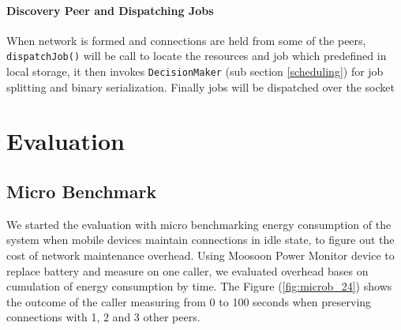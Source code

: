 \documentclass[conference]{IEEEtran}
\begin{document}
\noindent {}	

\paragraph{Discovery Peer and Dispatching Jobs}

When network is formed and connections are held from some of the peers, \texttt{dispatchJob()} will be call to locate the resources and job which predefined in local storage, it then invokes \texttt{DecisionMaker} (sub section \ref{scheduling}) for job splitting and binary serialization. Finally jobs will be dispatched over the socket\\

\noindent {}

\section{Evaluation}
\label{sec:eval}

\subsection{Micro Benchmark}
We started the evaluation with micro benchmarking energy consumption of the system when mobile devices maintain connections in idle state, to figure out the cost of network maintenance overhead. Using Moosoon Power Monitor device \cite{moosoon} to replace battery and measure on one caller, we evaluated overhead bases on cumulation of energy consumption by time. The Figure (\ref{fig:microb_24}) shows the outcome of the caller measuring from 0 to 100 seconds when preserving connections with 1, 2 and 3 other peers. 
\end{document}
